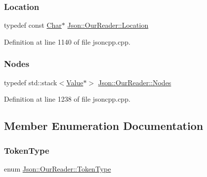\subsubsection{\texorpdfstring{Location}{Location}}
{\footnotesize\ttfamily typedef const \hyperlink{class_json_1_1_our_reader_a0cd0bab4caa66594ab843ccd5f9dc239}{Char}$\ast$ \hyperlink{class_json_1_1_our_reader_a1bdc7bbc52ba87cae6b19746f2ee0189}{Json\+::\+Our\+Reader\+::\+Location}}



Definition at line 1140 of file jsoncpp.\+cpp.

\mbox{\label{class_json_1_1_our_reader_a8480a5ef159cee3a090f96358414d8d3}} 
\subsubsection{\texorpdfstring{Nodes}{Nodes}}
{\footnotesize\ttfamily typedef std\+::stack$<$\hyperlink{class_json_1_1_value}{Value}$\ast$$>$ \hyperlink{class_json_1_1_our_reader_a8480a5ef159cee3a090f96358414d8d3}{Json\+::\+Our\+Reader\+::\+Nodes}\hspace{0.3cm}{\ttfamily [private]}}



Definition at line 1238 of file jsoncpp.\+cpp.



\subsection{Member Enumeration Documentation}
\mbox{\label{class_json_1_1_our_reader_a15116f7276ddf1e7a2cc3cbefa884dcc}} 
\subsubsection{\texorpdfstring{Token\+Type}{TokenType}}
{\footnotesize\ttfamily enum \hyperlink{class_json_1_1_our_reader_a15116f7276ddf1e7a2cc3cbefa884dcc}{Json\+::\+Our\+Reader\+::\+Token\+Type}\hspace{0.3cm}{\ttfamily [private]}}

